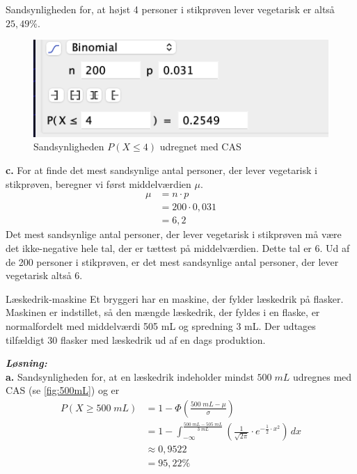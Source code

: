 \documentclass{article}
\newcommand{\sol}{\setlength{\parindent}{0cm}\textbf{\textit{Løsning:}}\setlength{\parindent}{1cm}}
\begin{document}
Sandsynligheden for, at højst 4 personer i stikprøven lever vegetarisk er altså $25,49 \%$.
\begin{figure}[H]
\begin{center}
  \includegraphics[width=\textwidth]{4p.png}
\end{center}
  \caption{Sandsynligheden $P(X \leq 4)$ udregnet med CAS}
\label{fig:4p}
\end{figure}
\noindent \textbf{c.}
For at finde det mest sandsynlige antal personer, der lever vegetarisk i stikprøven, beregner vi først middelværdien $\mu $.
\begin{equation*}
\begin{split}
  \mu &= n \cdot p \\
  &=200 \cdot 0,031 \\
  &=6,2
\end{split}
\end{equation*}
Det mest sandsynlige antal personer, der lever vegetarisk i stikprøven må være det ikke-negative hele tal, der er tættest på middelværdien.
Dette tal er $6$.
Ud af de 200 personer i stikprøven, er det mest sandsynlige antal personer, der lever vegetarisk altså 6.
\begin{question}{Læskedrik-maskine}{}
  Et bryggeri har en maskine, der fylder læskedrik på flasker. Maskinen er indstillet, så den mængde læskedrik, der fyldes i en flaske, er normalfordelt med middelværdi 505 mL og spredning 3 mL.
Der udtages tilfældigt 30 flasker med læskedrik ud af en dags produktion.
\end{question}
\sol \\
\textbf{a.}
Sandsynligheden for, at en læskedrik indeholder mindst $500 \;\unit{mL} $ udregnes med CAS (se \cref{fig:500mL}) og er 
\begin{equation*}
\begin{split}
  P(X \geq 500 \;\unit{mL} ) &=1-\Phi \left(\frac{500 \;\unit{mL} - \mu }{\sigma }\right) \\
  &=1- \int_{-\infty}^{\frac{500 \;\unit{mL} - 505 \;\unit{mL} }{3 \;\unit{mL} }} \left( \frac{1}{\sqrt{2 \pi } }\cdot e^{-\frac{1}{2} \cdot x^2}\right)  \,dx \\
  &\approx 0,9522 \\
  &=95,22 \%
\end{split}
\end{equation*}
\end{document}
